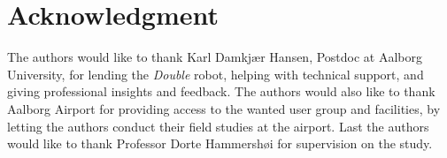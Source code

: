 \section*{Acknowledgment}
\label{Acknowledgment}
%
The authors would like to thank Karl Damkjær Hansen, Postdoc at Aalborg University, for lending the \textit{Double} robot, helping with technical support, and giving professional insights and feedback.
The authors would also like to thank Aalborg Airport for providing access to the wanted user group and facilities, by letting the authors conduct their field studies at the airport. Last the authors would like to thank Professor Dorte Hammershøi for supervision on the study. 